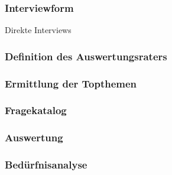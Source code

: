 \documentclass[../../main.tex]{subfiles}
\begin{document}
\subsubsection{Interviewform}
  Direkte Interviews

\subsubsection{Definition des Auswertungsraters}
\subsubsection{Ermittlung der Topthemen}
  
\subsubsection{Fragekatalog}

\subsubsection{Auswertung}

\subsubsection{Bedürfnisanalyse}
\end{document}
